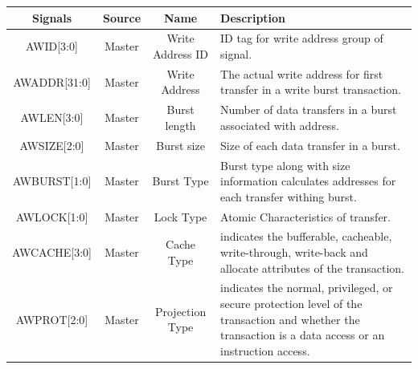\documentclass{article}
\begin{document}
\begin{table}[H]
    \begin{center}
        \begin{tabular}{c|c|c|p{9.5cm}}
            \textbf{Signals} & \textbf{Source} & \textbf{Name}       & \textbf{Description}                                                                                                                                                              \\
            \hline
            AWID[3:0]        & Master          & Write Address ID    & ID tag for write address group of signal.                                                                                                                                         \\
            AWADDR[31:0]     & Master          & Write Address       & The actual write address for first transfer in a write burst transaction.                                                                                                         \\
            AWLEN[3:0]       & Master          & Burst length        & Number of data transfers in a burst associated with address.                                                                                                                      \\
            AWSIZE[2:0]      & Master          & Burst size          & Size of each data transfer in a burst.                                                                                                                                            \\
            AWBURST[1:0]     & Master          & Burst Type          & Burst type along with size information calculates addresses for each transfer withing burst.                                                                                      \\
            AWLOCK[1:0]      & Master          & Lock Type           & Atomic Characteristics of transfer.                                                                                                                                               \\
            AWCACHE[3:0]     & Master          & Cache Type          & indicates the bufferable, cacheable, write-through, write-back and allocate attributes of the transaction.                                                                        \\
            AWPROT[2:0]      & Master          & Projection Type     & indicates the normal, privileged, or secure protection level of the transaction and whether the transaction is a data access or an instruction access.                            \\

\end{tabular}
\end{center}
\end{table}
\end{document}
